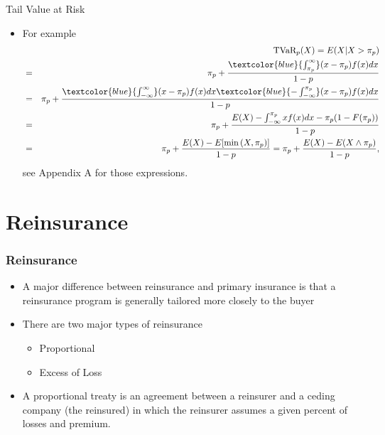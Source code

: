 \documentclass{beamer}
\begin{document}
\begin{frame}{Tail Value at Risk}
\begin{itemize}
\item For example
\begin{eqnarray*}
&&\text{TVaR}_p(X) = E(X|X>\pi_p) \\
&=& \pi_p + \frac{\textcolor{blue}{\int_{\pi_p}^{\infty}} (x-\pi_p) f(x) dx}{1-p} \\
&=& \pi_p + \frac{\textcolor{blue}{\int_{-\infty}^{\infty}} (x-\pi_p) f(x) dx \textcolor{blue}{-\int_{-\infty}^{\pi_p}} (x-\pi_p) f(x) dx }{1-p} \\
&=& \pi_p + \frac{E(X)-\int_{-\infty}^{\pi_p} xf(x) dx -\pi_p (1-F(\pi_p))}{1-p} \\
&=& \pi_p + \frac{E(X) - E[\min{(X,\pi_p)}]}{1-p} = \pi_p + \frac{E(X)-E(X \wedge \pi_p)}{1-p},
\end{eqnarray*}
see Appendix A for those expressions.
\end{itemize}
\end{frame}

\section{Reinsurance}

\begin{frame}%
\frametitle{Reinsurance}
\begin{itemize}
\item A major difference between reinsurance and primary insurance is that a reinsurance program is generally tailored more closely to the buyer
\item There are two major types of reinsurance
\begin{itemize}
\item Proportional
\item Excess of Loss
\end{itemize}
 \item A proportional treaty is an agreement between a reinsurer and a ceding company (the reinsured) in which the reinsurer assumes a given percent of losses and premium.
\end{itemize}
\end{frame}
\end{document}
